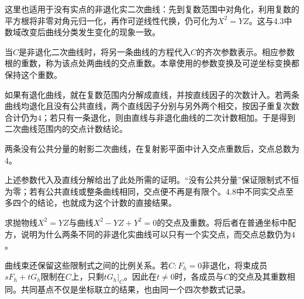 这里也适用于没有实点的非退化实二次曲线：先到复数范围中对角化，利用复数的平方根将非零对角元归一化，再作可逆线性代换，仍可化为\(X^2=YZ\)。这与4.3中数域改变后曲线分类发生变化的现象一致。

\begin{definition}
当\(C\)是非退化二次曲线时，将另一条曲线的方程代入\(C\)的齐次参数表示。相应参数根的重数，称为该点处两曲线的{\heiti{}交点重数}。本章使用的参数变换及可逆坐标变换都保持这个重数。
\end{definition}

如果有退化曲线，就在复数范围内分解成直线，并按直线因子的次数计入。若两条曲线均退化且没有公共直线，两个直线因子分别与另外两个相交，按因子重复次数合计仍为\(4\)；若只有一条退化，则由直线与非退化曲线的二次计数相加。于是得到二次曲线范围内的交点计数结论。

\begin{theorem}[二次曲线的Bézout关系]\label{thm:quadratic-projective-bezout}
两条没有公共分量的射影二次曲线，在复射影平面中计入交点重数后，交点总数为\(4\)。
\end{theorem}

上述参数代入及直线分解给出了此处所需的证明。“没有公共分量”保证限制式不恒为零；若有公共直线或整条曲线相同，交点便不再是有限个。4.8中不同实交点至多四个的结论，也就成为这个计数的直接结果。

\par\addvspace{6pt}
\noindent\begin{minipage}{\linewidth}
\begin{example}
求抛物线\(X^2=YZ\)与曲线\(X^2-YZ+Y^2=0\)的交点及重数。将后者在普通坐标中配方，说明为什么两条不同的非退化实曲线可以只有一个实交点，而交点总数仍为\(4\)。
\end{example}
\end{minipage}\par\addvspace{6pt}

曲线束还保留这些限制式之间的比例关系。若\(C:F_h=0\)非退化，将束成员\(sF_h+tG_h\)限制在\(C\)上，只剩\(tG_h|_C\)。因此在\(t\ne0\)时，各成员与\(C\)的交点及其重数相同。共同基点不仅是坐标联立的结果，也由同一个四次参数式记录。

